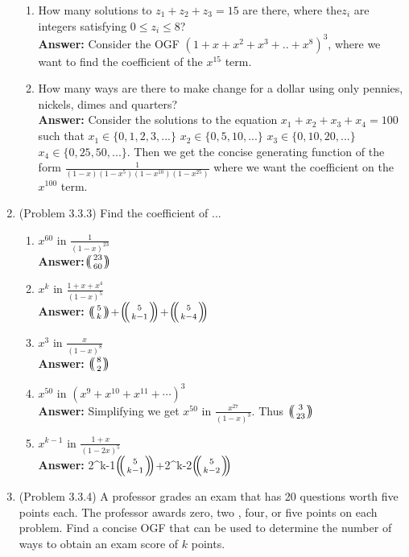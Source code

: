 \documentclass{amsart}
\def\multiset#1#2{\ensuremath{\left(\kern-.3em\left(\genfrac{}{}{0pt}{}{#1}{#2}\right)\kern-.3em\right)}}
\newcommand{\textmultiset}[2]{\bigl(\!{\binom{#1}{#2}}\!\bigr)}
\newcommand{\displaymultiset}[2]{\left(\!{\binom{#1}{#2}}\!\right)}
\newcommand\multiset[2]{\mathchoice{\displaymultiset{#1}{#2}}
                                {\textmultiset{#1}{#2}}
                                {\textmultiset{#1}{#2}}
                                {\textmultiset{#1}{#2}}}
\begin{document}
\begin{enumerate}
\begin{enumerate}
	
	\item  How many solutions to $z_1+z_2+z_3=15$ are there, where the$z_i$ are integers satisfying $0 \leq z_i \leq 8$?\\
	\textbf{Answer:}	 Consider the OGF $(1+x+x^2+x^3+..+x^8)^3$, where we want to find the coefficient of the $x^{15}$ term.\\
	
	
	\item  How many ways are there to make change for a dollar using only pennies, nickels, dimes and quarters?\\
	\textbf{Answer:}	 Consider the solutions to the equation $x_1+x_2+x_3+x_4=100$ such that  $x_1\in\{0,1,2,3,...\}$ $x_2\in\{0,5,10,...\}$ $x_3\in\{0,10,20,...\}$ $x_4\in\{0,25,50,...\}$. Then we get the concise generating function of the form  $\frac{1}{(1-x)(1-x^{5})(1-x^{10})(1-x^{25})}$ where we want the coefficient on the $x^{100}$ term.\\
	
	
	
\end{enumerate}
\item (Problem 3.3.3) Find the coefficient of ...\\
	\begin{enumerate}
	\item $x^{60}$ in $\frac{1}{(1-x)^{23}}$\\
	\textbf{Answer:}$\multiset{23}{60}$\\
	\item $x^{k}$ in $\frac{1+x+x^4}{(1-x)^5}$\\
	\textbf{Answer:} $\multiset{5}{k}$+$\multiset{5}{k-1}$+$\multiset{5}{k-4}$\\
	\item $x^{3}$ in $\frac{x}{(1-x)^8}$\\
	\textbf{Answer:} $\multiset{8}{2}$ \\
	\item $x^{50}$ in $(x^9+x^{10}+x^{11}+ \cdots)^3$\\
	\textbf{Answer:} Simplifying we get $x^{50}$ in $\frac{x^{27}}{(1-x)^3}$. Thus $\multiset{3}{23}$\\
	\item $x^{k-1}$ in $\frac{1+x}{(1-2x)^5}$\\
	\textbf{Answer:}  2^{k-1}$\multiset{5}{k-1}$+2^{k-2}$\multiset{5}{k-2}$\\
	\end{enumerate}

\item (Problem 3.3.4) A professor grades an exam that has 20 questions worth five points each. The professor awards zero, two , four, or five points on each problem. Find a concise OGF that can be used to determine the number of ways to obtain an exam score of $k$ points.\\


\end{enumerate}
\end{document}
